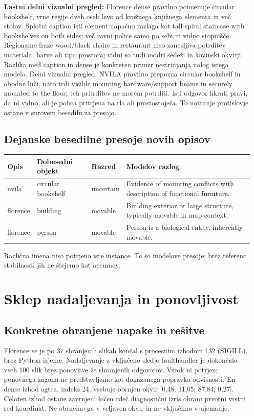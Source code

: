 \documentclass[10pt,a4paper]{article}
\begin{document}
\textbf{Lastni delni vizualni pregled:} Florence dense pravilno poimenuje circular bookshelf, vrne regije dveh oseb levo od krožnega knjižnega elementa in več stolov. Splošni caption isti element napačno razlaga kot tall spiral staircase with bookshelves on both sides; več ravni police samo po sebi ni vidno stopnišče. Regionalne fraze wood/black chairs in restaurant niso zanesljiva potrditev materiala, barve ali tipa prostora; vidni so tudi modri sedeži in kovinski okvirji. Razlika med caption in dense je konkreten primer nestrinjanja nalog istega modela. Delni vizualni pregled. NVILA pravilno prepozna circular bookshelf in obodne luči, nato trdi visible mounting hardware/support beams in securely mounted to the floor; teh pritrditev ne morem potrditi. Isti odgovor hkrati pravi, da ni vidno, ali je polica pritrjena na tla ali prostostoječa. To notranje protislovje ostane v surovem besedilu za presojo.
\subsection*{Dejanske besedilne presoje novih opisov}\begin{center}\small\begin{tabular}{p{1.6cm}p{4.2cm}p{1.8cm}p{7.6cm}}\toprule
Opis & Dobesedni objekt & Razred & Modelov razlog \\ \midrule
nvila & circular bookshelf & uncertain & Evidence of mounting conflicts with description of functional furniture. \\
florence & building & movable & Building exterior or large structure, typically movable in map context. \\
florence & person & movable & Person is a biological entity, inherently movable. \\
\bottomrule\end{tabular}\end{center}
Različna imena niso potrjeno iste instance. To so modelove presoje; brez referenc stabilnosti jih ne štejemo kot accuracy.

\newpage
\section*{Sklep nadaljevanja in ponovljivost}
\subsection*{Konkretne ohranjene napake in rešitve}
Florence se je po 37 shranjenih slikah končal s procesnim izhodom 132 (SIGILL), brez Python izjeme. Nadaljevanje z vključeno sledjo faulthandler je dokončalo vseh 100 slik brez ponovitve že shranjenih odgovorov. Vzrok ni potrjen; ponovnega zagona ne predstavljamo kot dokazanega popravka odvisnosti. En dense izhod agtea, indeks 24, vsebuje obrnjen okvir [0,48; 31,05; 87,84; 0,27]. Celoten izhod ostane zavrnjen; ločen rdeč diagnostični izris ohrani prvotni vrstni red koordinat. Ne obrnemo ga v veljaven okvir in ne vključimo v ujemanje.
\end{document}
